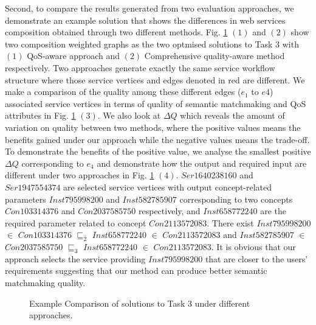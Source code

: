 \documentclass{IEEEtran}
\begin{document}
Second, to compare the results generated from two evaluation approaches, we demonstrate an example solution that shows the differences in web services composition obtained through two different methods. Fig. \ref{comparisontest} $(1)$ and $(2)$ show two composition weighted graphs as the two optmised solutions to Task 3 with $(1)$ QoS-aware approach and $(2)$ Comprehensive quality-aware method respectively. Two approaches generate exactly the same service workflow structure where those service vertices and edges denoted in red are different. We make a comparison of the quality among these different edges ($e_1$ to $e4$) associated service vertices in terms of quality of semantic matchmaking and QoS attributes in Fig. \ref{comparisontest} $(3)$. We also look at $\Delta Q$ which reveals the amount of variation on quality between two methods, where the positive values means the benefits gained under our approach while the negative values means the trade-off. To demonstrate the benefits of the positive value, we analyse the smallest positive $\Delta Q$ corresponding to $e_4$ and demonstrate how the output and required input are different under two approaches in Fig. \ref{comparisontest} $(4)$. $Ser1640238160$ and $Ser1947554374$ are selected service vertices with output concept-related parameters $Inst795998200$ and $Inst582785907$ corresponding to two concepts $Con103314376$ and $Con2037585750$ respectively, and $Inst658772240$ are the required parameter related to concept $Con2113572083$. There exist $Inst795998200$ $\in$ $Con103314376$ $\sqsubseteq_{2}$ $Inst658772240$ $\in$ $Con2113572083$ and $Inst582785907$ $\in$ $Con2037585750$ $\sqsubseteq_{3}$ $Inst658772240$ $\in$ $Con2113572083$. It is obvious that our approach selects the service providing $Inst795998200$ that are closer to the users' requirements suggesting that our method can produce better semantic matchmaking quality.

\begin{figure}[h]
 \caption{Example Comparison of solutions to Task 3 under different approaches.}
 \label{comparisontest}
\end{figure}
\end{document}
